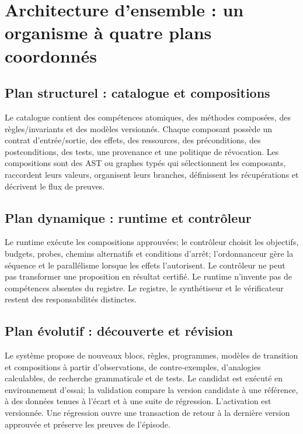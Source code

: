 \documentclass[11pt,a4paper]{article}
\begin{document}
\section{Architecture d'ensemble : un organisme à quatre plans coordonnés}
\subsection{Plan structurel : catalogue et compositions}
Le catalogue contient des compétences atomiques, des méthodes composées, des règles/invariants et des modèles versionnés. Chaque composant possède un contrat d'entrée/sortie, des effets, des ressources, des préconditions, des postconditions, des tests, une provenance et une politique de révocation. Les compositions sont des AST ou graphes typés qui sélectionnent les composants, raccordent leurs valeurs, organisent leurs branches, définissent les récupérations et décrivent le flux de preuves.

\subsection{Plan dynamique : runtime et contrôleur}
Le runtime exécute les compositions approuvées; le contrôleur choisit les objectifs, budgets, probes, chemins alternatifs et conditions d'arrêt; l'ordonnanceur gère la séquence et le parallélisme lorsque les effets l'autorisent. Le contrôleur ne peut pas transformer une proposition en résultat certifié. Le runtime n'invente pas de compétences absentes du registre. Le registre, le synthétiseur et le vérificateur restent des responsabilités distinctes.

\subsection{Plan évolutif : découverte et révision}
Le système propose de nouveaux blocs, règles, programmes, modèles de transition et compositions à partir d'observations, de contre-exemples, d'analogies calculables, de recherche grammaticale et de tests. Le candidat est exécuté en environnement d'essai; la validation compare la version candidate à une référence, à des données tenues à l'écart et à une suite de régression. L'activation est versionnée. Une régression ouvre une transaction de retour à la dernière version approuvée et préserve les preuves de l'épisode.
\end{document}
